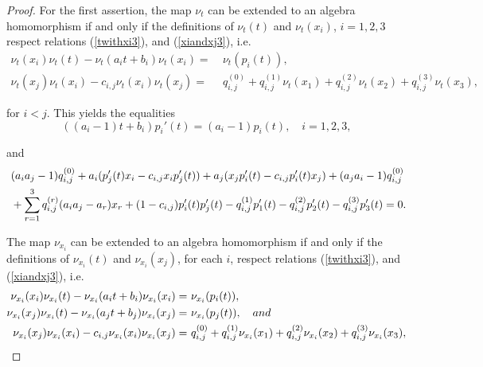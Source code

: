\documentclass{amsart}
\theoremstyle{definition}
\theoremstyle{remark}
\numberwithin{equation}{section}
\begin{document}
\begin{proof}
For the first assertion, the map $\nu_t$ can be extended to an
algebra homomorphism if and only if the definitions of $\nu_t(t)$ and $\nu_t(x_i)$, $i=1, 2, 3$ respect relations {\rm (}\ref{twithxi3}{\rm )}, and {\rm (}\ref{xiandxj3}{\rm )}, i.e.
\begin{align*}
   \nu_t(x_i)\nu_t(t)-\nu_t(a_it+b_i)\nu_t(x_i) = &\ \nu_t(p_i(t)), \\
   \nu_t(x_j)\nu_t(x_i)-c_{i,j}\nu_t(x_i)\nu_t(x_j) = &\ q_{i,j}^{(0)}+q_{i,j}^{(1)}\nu_t(x_1)+q_{i,j}^{(2)}\nu_t(x_2)+q_{i,j}^{(3)}\nu_t(x_3), 
\end{align*}

for $i<j$. This yields the equalities
\begin{equation} \label{firstsecondrel3}
    ((a_i-1)t+b_i)p_i'(t)=(a_i-1)p_i(t), \quad i = 1, 2, 3,
\end{equation}

and
{\small{
\begin{align}
  &\ (a_ia_j-1)q_{i,j}^{(0)} + a_i(p_j'(t)x_i-c_{i,j}x_ip_j'(t)) + a_j(x_jp_i'(t)-c_{i,j}p_i'(t)x_j) + (a_ja_i-1)q_{i,j}^{(0)} \notag \\ 
   &\ +\sum_{r=1}^{3}q_{i,j}^{(r)}(a_ia_j-a_r)x_r +(1-c_{i,j})p_i'(t)p_j'(t) - q_{i,j}^{(1)}p_1'(t)-q_{i,j}^{(2)}p_2'(t)-q_{i,j}^{(3)}p_3'(t)=0. \label{thirdrel3}
\end{align}
}}

The map $\nu_{x_i}$ can be extended to an algebra homomorphism if and only if the definitions of $\nu_{x_i}(t)$ and $\nu_{x_i}(x_j)$, for each $i$, respect relations {\rm (}\ref{twithxi3}{\rm )}, and {\rm (}\ref{xiandxj3}{\rm )}, i.e. 
{\small{
\begin{align*}
   \nu_{x_i}(x_i)\nu_{x_i}(t)-\nu_{x_i}(a_it+b_i)\nu_{x_i}(x_i) = &\ \nu_{x_i}(p_i(t)), \\
   \nu_{x_i}(x_j)\nu_{x_i}(t)-\nu_{x_i}(a_jt+b_j)\nu_{x_i}(x_j) = &\ \nu_{x_i}(p_j(t)), \quad {\rm and} \\
   \nu_{x_i}(x_j)\nu_{x_i}(x_i)-c_{i,j}\nu_{x_i}(x_i)\nu_{x_i}(x_j) = &\ q_{i,j}^{(0)}+q_{i,j}^{(1)}\nu_{x_i}(x_1)+q_{i,j}^{(2)}\nu_{x_i}(x_2)+q_{i,j}^{(3)}\nu_{x_i}(x_3),
\end{align*}
}}


\end{proof}
\end{document}
